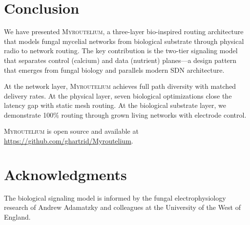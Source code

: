 \documentclass[conference,10pt]{IEEEtran}
\newcommand{\myc}{\textsc{Myroutelium}}
\begin{document}
\section{Conclusion}
\label{sec:conclusion}

We have presented \myc{}, a three-layer bio-inspired routing architecture that models fungal mycelial networks from biological substrate through physical radio to network routing. The key contribution is the two-tier signaling model that separates control (calcium) and data (nutrient) planes---a design pattern that emerges from fungal biology and parallels modern SDN architecture.

At the network layer, \myc{} achieves full path diversity with matched delivery rates. At the physical layer, seven biological optimizations close the latency gap with static mesh routing. At the biological substrate layer, we demonstrate 100\% routing through grown living networks with electrode control.

\myc{} is open source and available at \url{https://github.com/ghartrid/Myroutelium}.

\section*{Acknowledgments}

The biological signaling model is informed by the fungal electrophysiology research of Andrew Adamatzky and colleagues at the University of the West of England.

\balance

\end{document}

